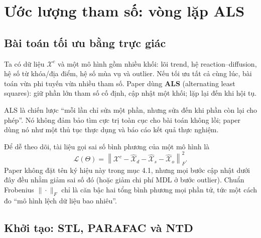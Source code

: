 \section{Ước lượng tham số: vòng lặp ALS}
\label{sec:estimation}

\subsection{Bài toán tối ưu bằng trực giác}

Ta có dữ liệu $\mathcal{X}^{c}$ và một mô hình gồm nhiều khối: lõi trend, hệ reaction--diffusion,
hệ số từ khóa/địa điểm, hệ số mùa vụ và outlier. Nếu tối ưu tất cả cùng lúc, bài toán vừa phi
tuyến vừa nhiều tham số. Paper dùng \textbf{ALS} (alternating least squares): giữ phần lớn tham
số cố định, cập nhật một khối; lặp lại đến khi hội tụ.

\begin{keypoint}
ALS là chiến lược ``mỗi lần chỉ sửa một phần, nhưng sửa đến khi phần còn lại cho phép''. Nó không
đảm bảo tìm cực trị toàn cục cho bài toán không lồi; paper dùng nó như một thủ tục thực dụng và
báo cáo kết quả thực nghiệm.
\end{keypoint}

Để dễ theo dõi, tài liệu gọi sai số bình phương của một mô hình là
\begin{equation}
  \mathcal{L}(\Theta)
  =\left\|\mathcal{X}^{c}
    -\widehat{\mathcal{X}}_d-\widehat{\mathcal{X}}_s-\widehat{\mathcal{X}}_o
   \right\|_F^2.
  \label{eq:als-loss}
\end{equation}
Paper không đặt tên ký hiệu này trong mục 4.1, nhưng mọi bước cập nhật dưới đây đều nhằm giảm
sai số đó (hoặc giảm chi phí MDL ở bước outlier). Chuẩn Frobenius $\|\cdot\|_F$ chỉ là căn bậc hai
tổng bình phương mọi phần tử, tức một cách đo ``mô hình lệch dữ liệu bao nhiêu''.

\subsection{Khởi tạo: STL, PARAFAC và NTD}


